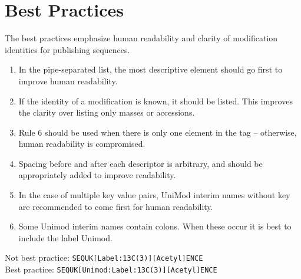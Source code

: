 
\section{Best Practices}

The best practices emphasize human readability and clarity of modification identities for publishing sequences.

\begin{enumerate}

\item In the pipe-separated list, the most descriptive element should go first to improve human readability.

\item If the identity of a modification is known, it should be listed. This improves the clarity over listing only masses or accessions.

\item Rule 6 should be used when there is only one element in the tag -- otherwise, human readability is compromised.

\item Spacing before and after each descriptor is arbitrary, and should be appropriately added to improve readability.

\item In the case of multiple key value pairs, UniMod interim names without key are recommended to come first for human readability.

\item Some Unimod interim names contain colons. When these occur it is best to include the label Unimod.

\end{enumerate}

\indent Not best practice: \texttt{SEQUK[Label:13C(3)][Acetyl]ENCE} \\
\indent Best practice: \texttt{SEQUK[Unimod:Label:13C(3)][Acetyl]ENCE} \\
